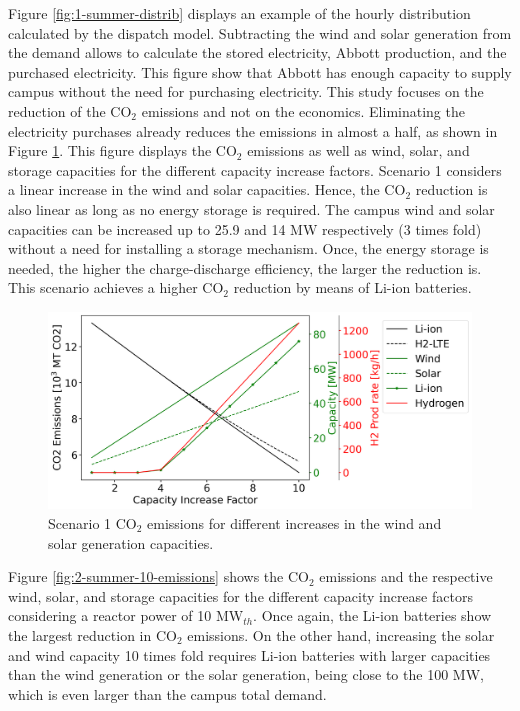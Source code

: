 \documentclass{anstrans}
\begin{document}
Figure \ref{fig:1-summer-distrib} displays an example of the hourly distribution calculated by the dispatch model.
Subtracting the wind and solar generation from the demand allows to calculate the stored electricity, Abbott production, and the purchased electricity.
This figure show that Abbott has enough capacity to supply campus without the need for purchasing electricity.
This study focuses on the reduction of the CO$_2$ emissions and not on the economics.
Eliminating the electricity purchases already reduces the emissions in almost a half, as shown in Figure \ref{fig:1-summer-emissions}.
This figure displays the CO$_2$ emissions as well as wind, solar, and storage capacities for the different capacity increase factors.
Scenario 1 considers a linear increase in the wind and solar capacities.
Hence, the CO$_2$ reduction is also linear as long as no energy storage is required.
The campus wind and solar capacities can be increased up to 25.9 and 14 MW respectively (3 times fold) without a need for installing a storage mechanism.
Once, the energy storage is needed, the higher the charge-discharge efficiency, the larger the reduction is.
This scenario achieves a higher CO$_2$ reduction by means of Li-ion batteries.

\begin{figure}[htbp!] %
    \centering
    \includegraphics[width=0.99\linewidth]{figures/scenario1-summerA}
    \hfill
    \caption{Scenario 1 CO$_2$ emissions for different increases in the wind and solar generation capacities.}
    \label{fig:1-summer-emissions}
\end{figure}

Figure \ref{fig:2-summer-10-emissions} shows the CO$_2$ emissions and the respective wind, solar, and storage capacities for the different capacity increase factors considering a reactor power of 10 MW$_{th}$.
Once again, the Li-ion batteries show the largest reduction in CO$_2$ emissions.
On the other hand, increasing the solar and wind capacity 10 times fold requires Li-ion batteries with larger capacities than the wind generation or the solar generation, being close to the 100 MW, which is even larger than the campus total demand.
\end{document}
